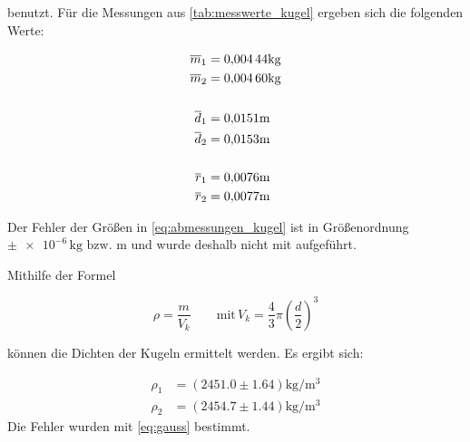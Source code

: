 benutzt.
Für die Messungen aus \ref{tab:messwerte_kugel} ergeben sich die
folgenden Werte:

\begin{align} %
\label{eq:abmessungen_kugel}
\begin{aligned}
\overline{m}_{1}&=  \num{0.00444}\si{\kilogram} \\
\overline{m}_{2}&= \num{0.00460} \si{\kilogram} \\
\hfill \\
\overline{d}_{1}&= \num{0.0151}\si{\meter} \\
\overline{d}_{2}&= \num{0.0153} \si{\meter} \\
\hfill\\
\overline{r}_{1}&= \num{0.0076}\si{\meter} \\
\overline{r}_{2}&= \num{0.0077} \si{\meter} \\
\end{aligned}
\end{align}

Der Fehler der Größen in \eqref{eq:abmessungen_kugel} ist in Größenordnung $\pm \num{e-6}\, \si{\kilogram}\, \,\text{bzw.}\, \, \si{\meter}$
und wurde deshalb nicht mit aufgeführt.

Mithilfe der Formel%

\begin{equation*}
\rho=\frac{m}{V_{k}} \qquad \text{mit} \, V_{k}=\frac{4}{3}\pi \left(\frac{d}{2}\right)^3
\end{equation*}

können die Dichten der Kugeln ermittelt werden.
Es ergibt sich:

\begin{align*}
\rho_{1}&=\left(\num{2451.0}\pm\num{1.64}\right) \si{\kilogram\per\cubic\meter}\\
\rho_{2}&=\left(\num{2454.7}\pm\num{1.44}\right) \si{\kilogram\per\cubic\meter}
\end{align*}
Die Fehler wurden mit \eqref{eq:gauss} bestimmt.
